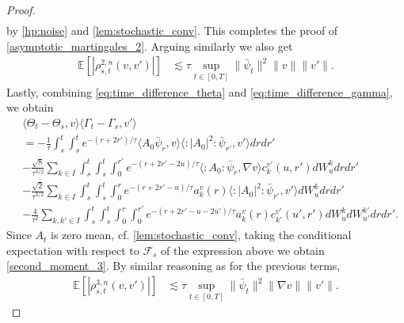 \documentclass[a4paper,10pt]{amsart}
\newcommand{\wick}[1]{:\mathrel{#1}:}
\theoremstyle{remark}
\numberwithin{equation}{section}
\begin{document}
\begin{proof}
\begin{align*}
    \end{align*}
    by \cref{hp:noise} and \cref{lem:stochastic_conv}. This completes the proof of \eqref{asymptotic_martingales_2}. Arguing similarly we also get
\begin{align*}
    \mathbb{E}\left[|\rho^{2,n}_{s,t}(v,v')|\right]& \lesssim \tau\sup_{t\in [0,T]}\|\bar{\psi}_t\|^2\|v\|\|v'\|.
\end{align*}
    Lastly, combining \eqref{eq:time_difference_theta} and \eqref{eq:time_difference_gamma}, we obtain
    \begin{align*}
        &\langle\Theta_t-\Theta_s,v\rangle\langle\Gamma_t-\Gamma_s,v'\rangle\\ &=-\frac{1}{\tau}\int_s^t\int_s^t e^{-(r+2r')/\tau} \langle A_0 \bar{\psi}_r, v\rangle \langle \wick{|A_0|^2} \bar{\psi}_{r'}, v'\rangle dr dr'\\ & -\frac{\sqrt{8}}{\tau^{3/2}}\sum_{k\in I}\int_s^t\int_s^t\int_0^{r'} e^{-(r+2r'-2u)/\tau}\langle \wick{A_0} \bar{\psi}_r, \nabla v\rangle c^{v'}_k(u,r') dW^{k}_u dr dr'\\ & -\frac{\sqrt{2}}{\tau^{3/2}}\sum_{k\in I}\int_s^t\int_s^t\int_0^{r} e^{-(r+2r'-u)/\tau} a_{k}^v(r) \langle \wick{|A_0|^2} \bar{\psi}_{r'}, v'\rangle  dW^{k}_u dr dr'\\ &-\frac{4}{\tau^2}\sum_{k,k'\in I}\int_s^t\int_s^t\int_0^r \int_0^{r'} e^{-(r+2r'-u-2u')/\tau} a_{k}^v(r) c_{k'}^{v'}(u',r') dW^{k}_u dW^{k'}_{u'}dr dr'.
    \end{align*}
    Since $A_t$ is zero mean, cf. \cref{lem:stochastic_conv}, taking the conditional expectation with respect to $\mathcal{F}_s$ of the expression above we obtain \eqref{second_moment_3}. By similar reasoning as for the previous terms,
    \begin{align*}
    \mathbb{E}\left[|\rho^{3,n}_{s,t}(v,v')|\right]& \lesssim \tau\sup_{t\in [0,T]}\|\bar{\psi}_t\|^2\|\nabla v\|\|v'\|.
\end{align*}
\end{proof}
\end{document}
